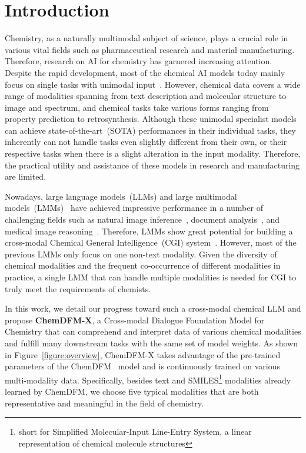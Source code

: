
    \maketitle

    
\section{Introduction}
Chemistry, as a naturally multimodal subject of science, plays a crucial role in various vital fields such as pharmaceutical research and material manufacturing. Therefore, research on AI for chemistry has garnered increasing attention. Despite the rapid development, most of the chemical AI models today mainly focus on single tasks with unimodal input~\cite{chemberta,chemformer,shi2023relm,chen2023towards}. However, chemical data covers a wide range of modalities spanning from text description and molecular structure to image and spectrum, and chemical tasks take various forms ranging from property prediction to retrosynthesis. Although these unimodal specialist models can achieve state-of-the-art~(SOTA) performances in their individual tasks, they inherently can not handle tasks even slightly different from their own, or their respective tasks when there is a slight alteration in the input modality. Therefore, the practical utility and assistance of these models in research and manufacturing are limited.

Nowadays, large language models~(LLMs) and large multimodal models~(LMMs)~\cite{mplugdocowl, internlmxcomposer,liu2024improved,gpt-4v,qwenvl,gemini} have achieved impressive performance in a number of challenging fields such as natural image inference~\cite{gemini,liu2024improved,gpt-4v}, document analysis~\cite{mplugdocowl, internlmxcomposer}, and medical image reasoning~\cite{tu2023generalist,yang2024advancing}. Therefore, LMMs show great potential for building a cross-modal Chemical General Intelligence~(CGI) system~\cite{zhao2024chemdfm}. However, most of the previous LMMs only focus on one non-text modality. Given the diversity of chemical modalities and the frequent co-occurrence of different modalities in practice, a single LMM that can handle multiple modalities is needed for CGI to truly meet the requirements of chemists. 

In this work, we detail our progress toward such a cross-modal chemical LLM and propose \textbf{ChemDFM-X}, a Cross-modal Dialogue Foundation Model for Chemistry that can comprehend and interpret data of various chemical modalities and fulfill many downstream tasks with the same set of model weights. As shown in Figure~\ref{figure:overview}, ChemDFM-X takes advantage of the pre-trained parameters of the ChemDFM~\cite{zhao2024chemdfm} model and is continuously trained on various multi-modality data.
Specifically, besides text and SMILES\footnote{short for Simplified Molecular-Input Line-Entry System, a linear representation of chemical molecule structures} modalities already learned by ChemDFM, we choose five typical modalities that are both representative and meaningful in the field of chemistry.

